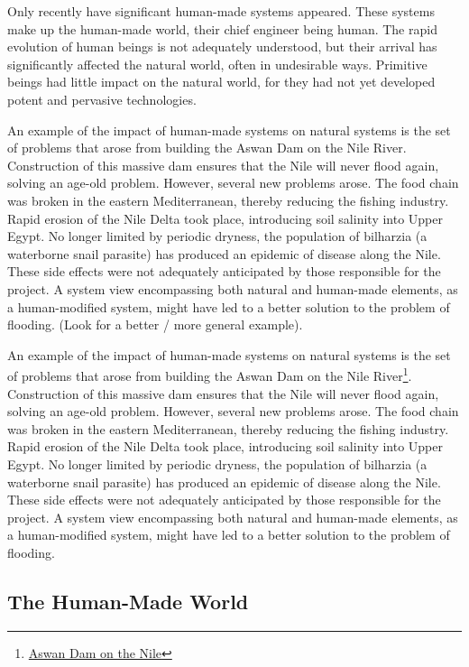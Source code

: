Only recently have significant human-made systems appeared. These systems make up the human-made world, their chief engineer being human. The rapid evolution of human beings is not adequately understood, but their arrival has significantly affected the natural world, often in undesirable ways. Primitive beings had little impact on the natural world, for they had not yet developed potent and pervasive technologies.

An example of the impact of human-made systems on natural systems is the set of problems that arose from building the Aswan Dam on the Nile River. Construction of this massive dam ensures that the Nile will never flood again, solving an age-old problem. However, several new problems arose. The food chain was broken in the eastern Mediterranean, thereby reducing the fishing industry. Rapid erosion of the Nile Delta took place, introducing soil salinity into Upper Egypt. No longer limited by periodic dryness, the population of bilharzia (a waterborne snail parasite) has produced an epidemic of disease along the Nile. These side effects were not adequately anticipated by those responsible for the project. A system view encompassing both natural and human-made elements, as a human-modified system, might have led to a better solution to the problem of flooding. (Look for a better / more general example).


An example of the impact of human-made systems on natural systems is the set of problems that arose from building the Aswan Dam on the Nile River\footnote{\href{http://www.edc.uri.edu/temp/ci/ciip/FallClass/Docs_2006/UrbanWaterfronts/Abu-Zeid\%20and\%20El-Shibini.pdf}{Aswan Dam on the Nile}}. Construction of this massive dam ensures that the Nile will never flood again, solving an age-old problem. However, several new problems arose. The food chain was broken in the eastern Mediterranean, thereby reducing the fishing industry. Rapid erosion of the Nile Delta took place, introducing soil salinity into Upper Egypt. No longer limited by periodic dryness, the population of bilharzia (a waterborne snail parasite) has produced an epidemic of disease along the Nile. These side effects were not adequately anticipated by those responsible for the project. A system view encompassing both natural and human-made elements, as a human-modified system, might have led to a better solution to the problem of flooding.

\subsection{The Human-Made World}\label{subsec:humanMadeWorld}

